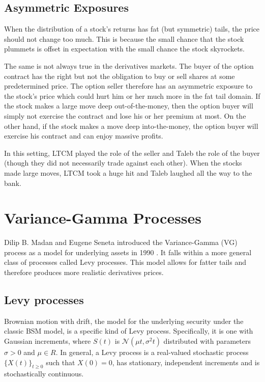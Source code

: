 \documentclass[twoside]{article}
\begin{document}
\begin{multicols}{2}
\subsection{Asymmetric Exposures}

When the distribution of a stock's returns has fat (but symmetric) tails, the price should not change too much. This is because the small chance that the stock plummets is offset in expectation with the small chance the stock skyrockets.

The same is not always true in the derivatives markets. The buyer of the option contract has the right but not the obligation to buy or sell shares at some predetermined price. The option seller therefore has an asymmetric exposure to the stock's price which could hurt him or her much more in the fat tail domain. If the stock makes a large move deep out-of-the-money, then the option buyer will simply not exercise the contract and lose his or her premium at most. On the other hand, if the stock makes a move deep into-the-money, the option buyer will exercise his contract and can enjoy massive profits.

In this setting, LTCM played the role of the seller and Taleb the role of the buyer (though they did not necessarily trade against each other). When the stocks made large moves, LTCM took a huge hit and Taleb laughed all the way to the bank.

\section{Variance-Gamma Processes}

Dilip B. Madan and Eugene Seneta introduced the Variance-Gamma (VG) process as a model for underlying assets in 1990 \cite{ngmbs}. It falls within a more general class of processes called Levy processes. This model allows for fatter tails and therefore produces more realistic derivatives prices.

\subsection{Levy processes}

Brownian motion with drift, the model for the underlying security under the classic BSM model, is a specific kind of Levy process. Specifically, it is one with Gaussian increments, where $S(t)$ is $\mathcal{N}(\mu t, \sigma^2 t)$ distributed with parameters $\sigma > 0$ and $\mu \in R$. In general, a Levy process is a real-valued stochastic process $\{X(t)\}_{t \geq 0}$ such that $X(0) = 0$, has stationary, independent increments and is stochastically continuous. \cite{ngmbs}


\end{multicols}
\end{document}
